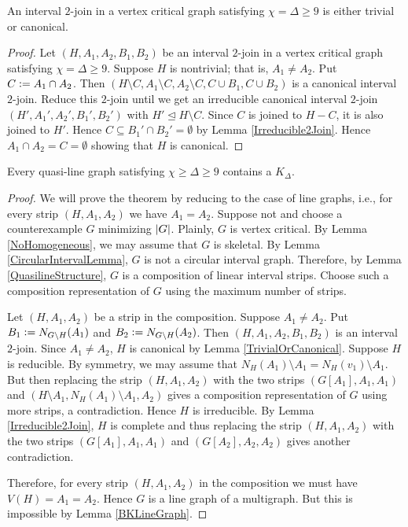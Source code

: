 \begin{lem}\label{TrivialOrCanonical}
An interval $2$-join in a vertex critical graph satisfying $\chi = \Delta \geq
9$ is either trivial or canonical.
\end{lem}  
\begin{proof}
Let $(H, A_1, A_2, B_1, B_2)$ be an interval $2$-join in a vertex critical graph
satisfying $\chi = \Delta \geq 9$. Suppose $H$ is nontrivial; that is, $A_1 \neq
A_2$.  Put $C \mathrel{\mathop:}= A_1 \cap A_2$. Then $(H \setminus C, A_1 \setminus C, A_2 \setminus C, C \cup B_1, C \cup B_2)$ is a canonical interval $2$-join.  
Reduce this $2$-join until we get an irreducible canonical interval $2$-join $(H', A_1', A_2', B_1', B_2')$ with $H' \unlhd H \setminus C$.  
Since $C$ is joined to $H-C$, it is also joined to $H'$.  Hence $C \subseteq B_1' \cap B_2' = \emptyset$ by Lemma \ref{Irreducible2Join}.  
Hence $A_1 \cap A_2 = C = \emptyset$ showing that $H$ is canonical.
\end{proof}


\begin{thm}\label{QuasiLineColoring}
Every quasi-line graph satisfying $\chi \geq \Delta \geq 9$ contains a
$K_\Delta$.
\end{thm}
\begin{proof}
We will prove the theorem by reducing to the case of line graphs, i.e., for
every strip $(H, A_1, A_2)$ we have $A_1=A_2$.
Suppose not and choose a counterexample $G$ minimizing $\left|G\right|$.  Plainly, $G$ is vertex critical.  
By Lemma \ref{NoHomogeneous}, we may assume that $G$ is skeletal.  By Lemma \ref{CircularIntervalLemma}, $G$ is not a circular interval graph.  
Therefore, by Lemma \ref{QuasilineStructure}, $G$ is a composition of linear interval strips.  Choose such a composition representation of $G$ using the maximum number of strips.  

Let $(H, A_1, A_2)$ be a strip in the composition.  Suppose $A_1 \neq A_2$.  Put $B_1 \mathrel{\mathop:}= N_{G\setminus H}(A_1)$ and $B_2 \mathrel{\mathop:}= N_{G\setminus H}(A_2)$.  
Then $(H, A_1, A_2, B_1, B_2)$ is an interval $2$-join.  Since $A_1 \neq A_2$,
$H$ is canonical by Lemma \ref{TrivialOrCanonical}. Suppose $H$ is reducible. 
By symmetry, we may assume that $N_H(A_1) \setminus A_1 = N_H(v_1) \setminus A_1$. But then replacing the strip $(H, A_1, A_2)$ with the two strips $(G[A_1], A_1, A_1)$ and $(H\setminus A_1, N_H(A_1)\setminus A_1, A_2)$ gives a composition representation of $G$ using more strips, a contradiction.  Hence $H$ is irreducible.  By Lemma \ref{Irreducible2Join}, $H$ is complete and thus replacing the strip $(H, A_1, A_2)$ with the two strips $(G[A_1], A_1, A_1)$ and $(G[A_2], A_2, A_2)$ gives another contradiction.

Therefore, for every strip $(H, A_1, A_2)$ in the composition we must have $V(H) = A_1 = A_2$.  Hence $G$ is a line graph of a multigraph.  
But this is impossible by Lemma \ref{BKLineGraph}.
\end{proof}
